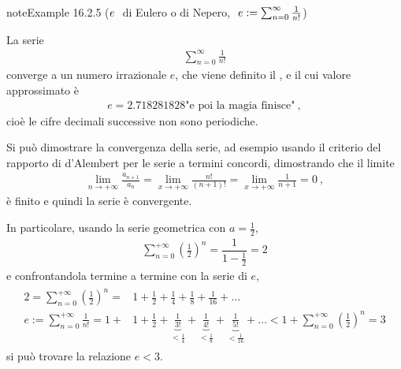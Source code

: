 \documentclass[letterpaper,10pt,italian]{jupyterBook}
\begin{document}
\begin{sphinxadmonition}{note}{Example 16.2.5 (\protect\(e\ \protect\) di Eulero o di Nepero, \protect\(\ e := \sum_{n=0}^{\infty} \frac{1}{n!}\protect\))}



\sphinxAtStartPar
La serie
\begin{equation*}
\begin{split}\sum_{n=0}^{\infty} \frac{1}{n!}\end{split}
\end{equation*}
\sphinxAtStartPar
converge a un numero irrazionale \(e\), che viene definito il , e il cui valore approssimato è
\begin{equation*}
\begin{split}e = 2.718281828\text{"e poi la magia finisce"} \ ,\end{split}
\end{equation*}
\sphinxAtStartPar
cioè le cifre decimali successive non sono periodiche.

\sphinxAtStartPar
Si può dimostrare la convergenza della serie, ad esempio usando il criterio del rapporto di d’Alembert per le serie a termini concordi, dimostrando che il limite
\begin{equation*}
\begin{split}\lim_{n \rightarrow +\infty} \frac{a_{n+1}}{a_n} = \lim_{x \rightarrow +\infty}\frac{n!}{(n+1)!} = \lim_{x \rightarrow +\infty} \frac{1}{n+1} = 0 \ ,\end{split}
\end{equation*}
\sphinxAtStartPar
è finito e quindi la serie è convergente.

\sphinxAtStartPar
In particolare, usando la serie geometrica con \(a = \frac{1}{2}\),
\begin{equation*}
\begin{split}\sum_{n=0}^{+\infty} \left(\frac{1}{2} \right)^n = \dfrac{1}{1 - \frac{1}{2}} = 2\end{split}
\end{equation*}
\sphinxAtStartPar
e confrontandola termine a termine con la serie di \(e\),
\begin{equation*}
\begin{split}\begin{aligned}
  2  = \sum_{n=0}^{+\infty} \left(\frac{1}{2} \right)^n = & 1 + \frac{1}{2} + \frac{1}{4} + \frac{1}{8} + \frac{1}{16} + \dots \\
  e := \sum_{n=0}^{+\infty} \frac{1}{n!} = 1 + & 1 + \frac{1}{2} + \underbrace{\frac{1}{3!}}_{<\frac{1}{4}} + \underbrace{\frac{1}{4!}}_{< \frac{1}{8}} + \underbrace{\frac{1}{5!}}_{< \frac{1}{16}} + \dots <
    1 + \sum_{n=0}^{+\infty} \left( \frac{1}{2} \right)^n = 3
\end{aligned}\end{split}
\end{equation*}
\sphinxAtStartPar
si può trovare la relazione \(e < 3\).

\sphinxAtStartPar
{} 
\end{sphinxadmonition}
\end{document}
